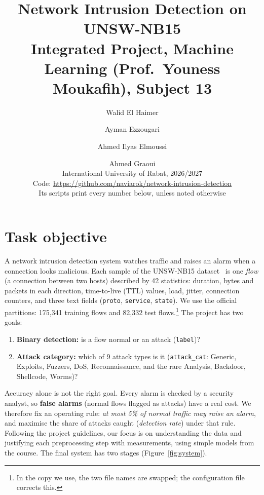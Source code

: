 \documentclass[11pt,a4paper]{article}
\title{\vspace{-1.4cm}Network Intrusion Detection on UNSW-NB15\\[2pt]
\large Integrated Project, Machine Learning (Prof.\ Youness Moukafih), Subject 13}
\author{Walid El Haimer \and Ayman Ezzougari \and Ahmed Ilyas Elmoussi \and Ahmed Graoui\\[1pt]
\small International University of Rabat, 2026/2027\\
\small Code: \url{https://github.com/naviarok/network-intrusion-detection}\\
\small Its scripts print every number below, unless noted otherwise}
\date{}
\begin{document}
\maketitle
\vspace{-1cm}

\section{Task objective}

A network intrusion detection system watches traffic and raises an alarm when a connection looks
malicious. Each sample of the UNSW-NB15 dataset~\cite{unsw} is one \emph{flow} (a connection
between two hosts) described by 42 statistics: duration, bytes and packets in each direction,
time-to-live (TTL) values, load, jitter, connection counters, and three text fields (\texttt{proto},
\texttt{service}, \texttt{state}). We use the official partitions: 175{,}341 training flows and
82{,}332 test flows.\footnote{In the copy we use, the two file names are swapped; the configuration
file corrects this.} The project has two goals:
\begin{enumerate}
\item \textbf{Binary detection:} is a flow normal or an attack (\texttt{label})?
\item \textbf{Attack category:} which of 9 attack types is it (\texttt{attack\_cat}: Generic,
Exploits, Fuzzers, DoS, Reconnaissance, and the rare Analysis, Backdoor, Shellcode, Worms)?
\end{enumerate}
Accuracy alone is not the right goal. Every alarm is checked by a security analyst, so
\textbf{false alarms} (normal flows flagged as attacks) have a real cost. We therefore fix an
operating rule: \emph{at most 5\% of normal traffic may raise an alarm}, and maximise the share of
attacks caught (\emph{detection rate}) under that rule. Following the project guidelines, our focus
is on understanding the data and justifying each preprocessing step with measurements, using simple
models from the course. The final system has two stages (Figure~\ref{fig:system}).
\end{document}
